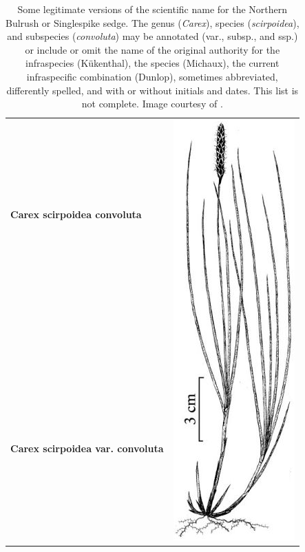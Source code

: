 \documentclass{bmcart}
\begin{document}
\begin{table}[!htb]
  \begin{center}

  \caption{Some legitimate versions of the scientific name for the Northern
    Bulrush or Singlespike sedge.  The genus (\textit{Carex}), species
    (\textit{scirpoidea}), and subspecies (\textit{convoluta}) may be annotated
    (var., subsp., and ssp.) or include or omit the name of the original authority for the
    infraspecies (Kükenthal), the species (Michaux), the current infraspecific
    combination (Dunlop), sometimes abbreviated, differently spelled, and with
    or without initials and dates. This list is not complete.  Image courtesy of \cite{FNA2002}.}\label{table:carex}

    \begin{tabular}{| l | c |}
    \hline
    \textbf{Carex scirpoidea convoluta} &
    \multirow{26}{*}{\includegraphics[scale=0.3]{images/1.png}} \\
    & \\
    \textbf{Carex scirpoidea var. convoluta} & \\

\end{tabular}
\end{center}
\end{table}
\end{document}
